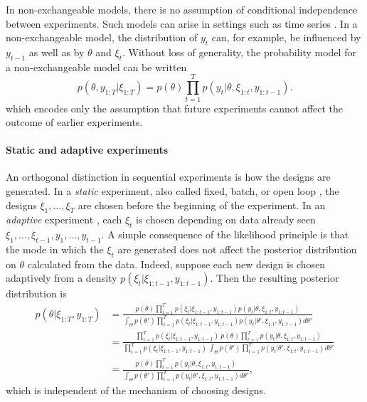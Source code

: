\documentclass[a4paper, 10pt]{report}
\theoremstyle{plain}
\begin{document}
	In non-exchangeable models, there is no assumption of conditional independence between experiments.
	Such models can arise in settings such as time series \citep{pole2018applied}. In a non-exchangeable model, the distribution of $y_t$ can, for example, be influenced by $y_{t-1}$ as well as by $\theta$ and $\xi_t$. Without loss of generality, the probability model for a non-exchangeable model can be written
	\begin{equation}
	p(\theta,y_{1:T}|\xi_{1:T}) = p(\theta)\prod_{t=1}^T p(y_t|\theta,\xi_{1:t},y_{1:t-1}).
	\end{equation}
	which encodes only the assumption that future experiments cannot affect the outcome of earlier experiments. 
	
	\paragraph{Static and adaptive experiments}
	An orthogonal distinction in sequential experiments is how the designs are generated.
	In a \emph{static} experiment, also called fixed, batch, or open loop \citep{distefano2014schaum}, the designs $\xi_1,\dots,\xi_T$ are chosen before the beginning of the experiment.
	In an \emph{adaptive} experiment \citep{myung2013}, each $\xi_t$ is chosen depending on data already seen $\xi_1,\dots,\xi_{t-1},y_1,\dots,y_{t-1}$.
	A simple consequence of the likelihood principle \citep{barnard1962likelihood,birnbaum1962foundations} is that the mode in which the $\xi_t$ are generated does not affect the posterior distribution on $\theta$ calculated from the data. Indeed, suppose each new design is chosen adaptively from a density $p(\xi_t|\xi_{1:t-1},y_{1:t-1})$. Then the resulting posterior distribution is
	\begin{align}
	p(\theta|\xi_{1:T},y_{1:T}) &= \frac{p(\theta)\prod_{t=1}^T p(\xi_t|\xi_{1:t-1},y_{1:t-1}) p(y_t|\theta,\xi_{1:t},y_{1:t-1})}{\int_\Theta p(\theta')\prod_{t=1}^T p(\xi_t|\xi_{1:t-1},y_{1:t-1}) p(y_t|\theta',\xi_{1:t},y_{1:t-1}) d\theta'} \\
	&=\frac{\prod_{t=1}^T p(\xi_t|\xi_{1:t-1},y_{1:t-1}) \ p(\theta) \prod_{t=1}^T p(y_t|\theta,\xi_{1:t},y_{1:t-1})}{\prod_{t=1}^T p(\xi_t|\xi_{1:t-1},y_{1:t-1}) \ \int_\Theta p(\theta')\prod_{t=1}^T p(y_t|\theta',\xi_{1:t},y_{1:t-1}) d\theta'} \\
	&=\frac{p(\theta) \prod_{t=1}^T p(y_t|\theta,\xi_{1:t},y_{1:t-1})}{\int_\Theta p(\theta')\prod_{t=1}^T p(y_t|\theta',\xi_{1:t},y_{1:t-1}) d\theta'},
	\end{align}
	which is independent of the mechanism of choosing designs.
	
\end{document}
